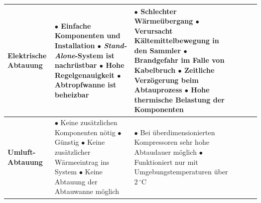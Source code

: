 \begin{table}
\begin{tabular}{p{3.8cm}p{5.6cm}p{5.6cm}lll}
\hline
\textbf{Elektrische Abtauung }
&$\bullet$ Einfache Komponenten und Installation 
\newline 
$\bullet$ \textit{Stand-Alone}-System ist nachrüstbar		
\newline
$\bullet$ Hohe Regelgenauigkeit	
\newline
$\bullet$ Abtropfwanne ist beheizbar 					
&
$\bullet$ Schlechter Wärmeübergang 
\newline					
$\bullet$ Verursacht Kältemittelbewegung in den Sammler
\newline 
$\bullet$ Brandgefahr im Falle von Kabelbruch  
\newline
$\bullet$ Zeitliche Verzögerung beim Abtauprozess 
\newline
$\bullet$ Hohe thermische Belastung der Komponenten    
\\

 
\hline
\textbf{Umluft-Abtauung }
&
$\bullet$	Keine zusätzlichen Komponenten nötig			 
\newline
$\bullet$	Günstig										
\newline
$\bullet$	Keine zusätzlicher Wärmeeintrag ins System	  
\newline
$\bullet$	Keine Abtauung der Abtauwanne möglich	
&
$\bullet$ Bei überdimensionierten Kompressoren sehr hohe Abtaudauer möglich
\newline
$\bullet$ Funktioniert nur mit Umgebungstemperaturen über $ 2\,^{\circ}\mathrm{C} $
\\
\hline

\end{tabular}
\label{tab:Vor- und Nachteile}
\end{table}
